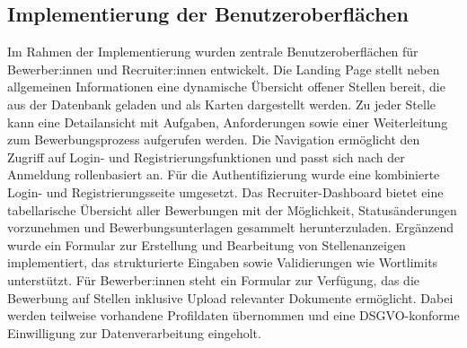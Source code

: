 \subsection{Implementierung der Benutzeroberflächen}
Im Rahmen der Implementierung wurden zentrale Benutzeroberflächen für Bewerber:innen und Recruiter:innen entwickelt. 
Die Landing Page stellt neben allgemeinen Informationen eine dynamische Übersicht offener Stellen bereit, die aus der Datenbank geladen und als Karten dargestellt werden. 
Zu jeder Stelle kann eine Detailansicht mit Aufgaben, Anforderungen sowie einer Weiterleitung zum Bewerbungsprozess aufgerufen werden.
\newline
Die Navigation ermöglicht den Zugriff auf Login- und Registrierungsfunktionen und passt sich nach der Anmeldung rollenbasiert an. Für die Authentifizierung wurde eine kombinierte Login- und Registrierungsseite umgesetzt.
\newline
Das Recruiter-Dashboard bietet eine tabellarische Übersicht aller Bewerbungen mit der Möglichkeit, Statusänderungen vorzunehmen und Bewerbungsunterlagen gesammelt herunterzuladen. 
Ergänzend wurde ein Formular zur Erstellung und Bearbeitung von Stellenanzeigen implementiert, das strukturierte Eingaben sowie Validierungen wie Wortlimits unterstützt.
\newline
Für Bewerber:innen steht ein Formular zur Verfügung, das die Bewerbung auf Stellen inklusive Upload relevanter Dokumente ermöglicht. 
Dabei werden teilweise vorhandene Profildaten übernommen und eine DSGVO-konforme Einwilligung zur Datenverarbeitung eingeholt.
